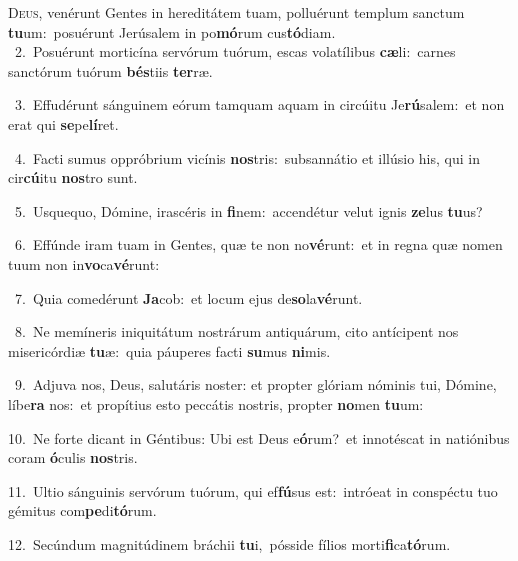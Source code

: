 \lettrine{\initial\textcolor{\initialcolor}{D}}{eus,} venérunt Gentes in hereditátem tuam, polluérunt templum sanctum \textbf{tu}\-um:~\star posuérunt Jerúsalem in po\-\textbf{mó}\-rum cus\-\textbf{tó}\-diam.\\
{\numbfont\textcolor{\numbcolor}{~2.}}~Posuérunt morticína servórum tuórum, escas volatílibus \textbf{cæ}\-li:~\star carnes sanctórum tuórum \textbf{bés}\-tiis \textbf{ter}\-ræ.\par
{\numbfont\textcolor{\numbcolor}{~3.}}~Effudérunt sánguinem eórum tamquam aquam in circúitu Je\-\textbf{rú}\-salem:~\star et non erat qui \textbf{se}\-pe\-\textbf{lí}\-ret.\par
{\numbfont\textcolor{\numbcolor}{~4.}}~Facti sumus oppróbrium vicínis \textbf{nos}\-tris:~\star subsannátio et illúsio his, qui in cir\-\textbf{cú}\-itu \textbf{nos}\-tro sunt.\par
{\numbfont\textcolor{\numbcolor}{~5.}}~Usquequo, Dómine, irascéris in \textbf{fi}\-nem:~\star accendétur velut ignis \textbf{ze}\-lus \textbf{tu}\-us?\par
{\numbfont\textcolor{\numbcolor}{~6.}}~Effúnde iram tuam in Gentes, quæ te non no\-\textbf{vé}\-runt:~\star et in regna quæ nomen tuum non in\-\textbf{vo}\-ca\-\textbf{vé}\-runt:\par
{\numbfont\textcolor{\numbcolor}{~7.}}~Quia comedérunt \textbf{Ja}\-cob:~\star et locum ejus de\-\textbf{so}\-la\-\textbf{vé}\-runt.\par
{\numbfont\textcolor{\numbcolor}{~8.}}~Ne memíneris iniquitátum nostrárum antiquárum, cito antícipent nos misericórdiæ \textbf{tu}\-æ:~\star quia páuperes facti \textbf{su}\-mus \textbf{ni}\-mis.\par
{\numbfont\textcolor{\numbcolor}{~9.}}~Adjuva nos, Deus, salutáris noster: et propter glóriam nóminis tui, Dómine, líbe\textbf{ra} nos:~\star et propítius esto peccátis nostris, propter \textbf{no}\-men \textbf{tu}\-um:\par
{\numbfont\textcolor{\numbcolor}{10.}}~Ne forte dicant in Géntibus: Ubi est Deus e\-\textbf{ó}\-rum?~\star et innotéscat in natiónibus coram \textbf{ó}\-culis \textbf{nos}\-tris.\par
{\numbfont\textcolor{\numbcolor}{11.}}~Ultio sánguinis servórum tuórum, qui ef\-\textbf{fú}\-sus est:~\star intróeat in conspéctu tuo gémitus com\-\textbf{pe}\-di\-\textbf{tó}\-rum.\par
{\numbfont\textcolor{\numbcolor}{12.}}~Secúndum magnitúdinem bráchii \textbf{tu}\-i,~\star pósside fílios morti\-\textbf{fi}\-ca\-\textbf{tó}\-rum.\par
